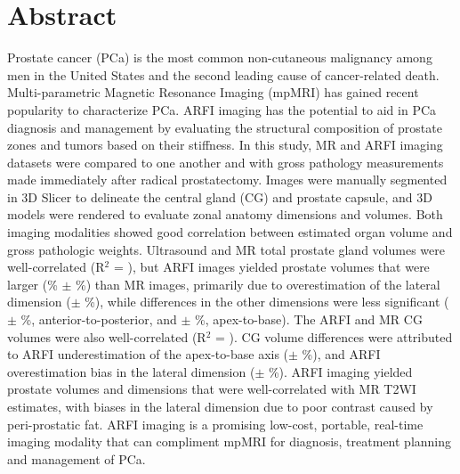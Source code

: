 \section*{Abstract}
Prostate cancer (PCa) is the most common non-cutaneous malignancy among men in
the United States and the second leading cause of cancer-related death.
Multi-parametric Magnetic Resonance Imaging (mpMRI) has gained recent
popularity to characterize PCa.  ARFI imaging has the potential to aid in PCa
diagnosis and management by evaluating the structural composition of prostate
zones and tumors based on their stiffness.  In this study, \invivo MR and ARFI
imaging datasets were compared to one another and with gross pathology
measurements made immediately after radical prostatectomy.  Images were
manually segmented in 3D Slicer to delineate the central gland (CG) and
prostate capsule, and 3D models were rendered to evaluate zonal anatomy
dimensions and volumes.  Both imaging modalities showed good correlation
between estimated organ volume and gross pathologic weights.  Ultrasound and MR
total prostate gland volumes were well-correlated (R$^2$ = \MRarfiVolTotalRsq),
but ARFI images yielded prostate volumes that were larger
(\MRarfiVolTotalMeanDiff\% $\pm$ \MRarfiVolTotalStdDiff\%) than MR images,
primarily due to overestimation of the lateral dimension
(\ARFImrTotalLatLatMeanPct $\pm$ \ARFImrTotalLatLatStdPct\%), while differences
in the other dimensions were less significant (\ARFImrTotalAntPostMeanPct $\pm$
\ARFImrTotalAntPostStdPct\%, anterior-to-posterior, and
\ARFImrTotalApexBaseMeanPct $\pm$ \ARFImrTotalApexBaseStdPct\%, apex-to-base).
The ARFI and MR CG volumes were also well-correlated (R$^2$ =
\MRarfiVolCentralRsq).  CG volume differences were attributed to ARFI
underestimation of the apex-to-base axis (\ARFImrCentralApexBaseMeanPct $\pm$
\ARFImrCentralApexBaseStdPct\%), and ARFI overestimation bias in the lateral
dimension (\ARFImrCentralLatLatMeanPct $\pm$ \ARFImrCentralLatLatStdPct\%).
ARFI imaging yielded prostate volumes and dimensions that were well-correlated
with MR T2WI estimates, with biases in the lateral dimension due to poor
contrast caused by peri-prostatic fat.  ARFI imaging is a promising low-cost,
portable, real-time imaging modality that can compliment mpMRI for diagnosis,
treatment planning and management of PCa.
